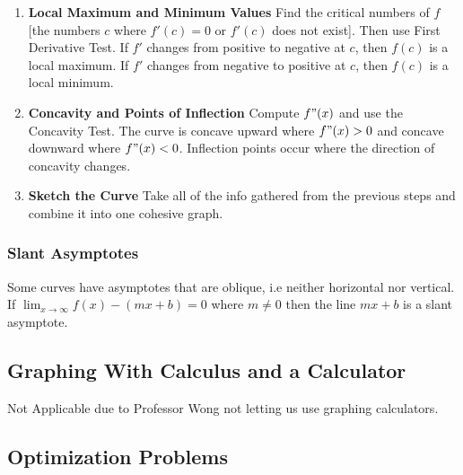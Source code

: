\documentclass[10pt,a4paper]{article}
\begin{document}
\begin{enumerate}
			\item \textbf{Local Maximum and Minimum Values} Find the critical numbers of $f$[the numbers $c$ where $f'(c)=0$ or $f'(c)$ does not exist]. Then use First Derivative Test. If $f'$ changes from positive to negative at $c$, then $f(c)$ is a local maximum. If $f'$ changes from negative to positive at $c$, then $f(c)$ is a local minimum.
			
			\item \textbf{Concavity and Points of Inflection} Compute $f"(x)$ and use the Concavity Test. The curve is concave upward where $f"(x) > 0$ and concave downward where $f"(x) < 0$. Inflection points occur where the direction of concavity changes.
			
			\item \textbf{Sketch the Curve} Take all of the info gathered from the previous steps and combine it into one cohesive graph.
	\end{enumerate}	
	\subsubsection{Slant Asymptotes}
		Some curves have asymptotes that are oblique, i.e neither horizontal nor vertical.
		\\ If $\lim_{x \rightarrow \infty}{f(x)-(mx+b)} = 0$ where $m \neq 0$ then the line $mx+b$ is a slant asymptote.
\subsection{Graphing With Calculus and a Calculator}
Not Applicable due to Professor Wong not letting us use graphing calculators.

\subsection{Optimization Problems}
\end{document}
